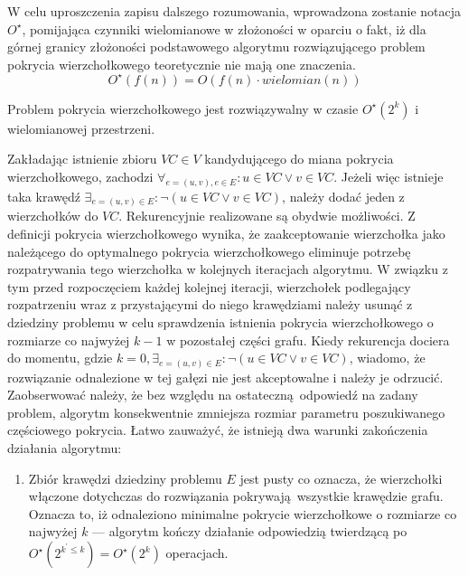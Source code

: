 \par{
  W celu uproszczenia zapisu dalszego rozumowania, wprowadzona zostanie notacja
  $O^{\star}$, pomijająca czynniki wielomianowe w złożoności w oparciu o fakt, 
  iż dla górnej granicy złożoności podstawowego algorytmu rozwiązującego problem 
  pokrycia wierzchołkowego teoretycznie nie mają one znaczenia.
  \begin{equation*}
    O^{\star}(f(n))=O(f(n) \cdot wielomian(n))
  \end{equation*}

  \begin{theorem}
    Problem pokrycia wierzchołkowego jest rozwiązywalny w czasie $O^{\star}(2^k)$
    i wielomianowej przestrzeni.
  \end{theorem}
  \begin{bproof}
    Zakładając istnienie zbioru $VC \in V$ kandydującego do miana pokrycia wierzchołkowego, zachodzi $\forall_{e=(u,v), e \in E}: u \in VC \lor v \in VC$.
    Jeżeli więc istnieje taka krawędź $\exists_{e=(u,v) \in E}: \neg(u \in VC \lor v \in VC)$, należy dodać jeden z wierzchołków do $VC$.
    Rekurencyjnie realizowane są obydwie możliwości.
    Z definicji pokrycia wierzchołkowego wynika, że zaakceptowanie wierzchołka jako należącego do optymalnego pokrycia wierzchołkowego eliminuje potrzebę rozpatrywania tego wierzchołka w kolejnych iteracjach algorytmu.
    W związku z tym przed rozpoczęciem każdej kolejnej iteracji, wierzchołek podlegający rozpatrzeniu wraz z przystającymi do niego krawędziami należy usunąć z dziedziny problemu w celu sprawdzenia istnienia pokrycia wierzchołkowego o rozmiarze co najwyżej $k-1$ w pozostałej części grafu.
    Kiedy rekurencja dociera do momentu, gdzie $k=0, \exists_{e=(u,v) \in E}:
    \neg(u \in VC \lor v \in VC)$, wiadomo, że rozwiązanie odnalezione w tej
    gałęzi nie jest akceptowalne i należy je odrzucić.
    Zaobserwować należy, że bez względu na ostateczną odpowiedź na zadany problem, algorytm konsekwentnie zmniejsza rozmiar parametru poszukiwanego częściowego pokrycia.
    Łatwo zauważyć, że istnieją dwa warunki zakończenia działania algorytmu:
    \begin{enumerate}
      \item Zbiór krawędzi dziedziny problemu $E$ jest pusty co oznacza, że wierzchołki włączone dotychczas do rozwiązania pokrywają wszystkie krawędzie grafu.
      Oznacza to, iż odnaleziono minimalne pokrycie wierzchołkowe o rozmiarze co najwyżej $k$ --- algorytm kończy działanie odpowiedzią twierdzącą po $O^\star(2^{k^\prime \leq k})=O^\star(2^k)$ operacjach.

\end{enumerate}
\end{bproof}}

